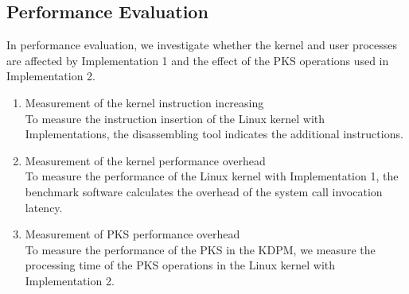 \subsection{Performance Evaluation}



In performance evaluation, we investigate whether the kernel and user processes
are affected by Implementation 1 and the effect of the PKS operations used in
Implementation 2.


\begin{enumerate}[topsep=0pt]%

\item Measurement of the kernel instruction increasing\\
To measure the instruction insertion of the Linux kernel with Implementations,
the disassembling tool indicates the additional instructions. 

\item Measurement of the kernel performance overhead\\
To measure the performance of the Linux kernel with Implementation 1, the benchmark
software calculates the overhead of the system call invocation latency.

\item Measurement of PKS performance overhead\\
To measure the performance of the PKS in the KDPM, we measure the processing
time of the PKS operations in the Linux kernel with Implementation 2.
    
\end{enumerate}
  

